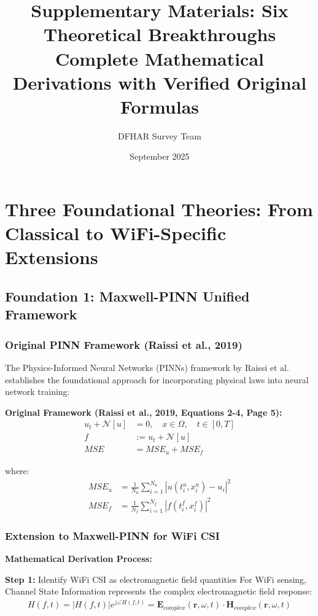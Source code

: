 \documentclass[12pt,a4paper]{article}
\title{Supplementary Materials: Six Theoretical Breakthroughs\\Complete Mathematical Derivations with Verified Original Formulas}
\author{DFHAR Survey Team}
\date{September 2025}
\begin{document}
\maketitle

\section{Three Foundational Theories: From Classical to WiFi-Specific Extensions}

\subsection{Foundation 1: Maxwell-PINN Unified Framework}

\subsubsection{Original PINN Framework (Raissi et al., 2019)}

The Physics-Informed Neural Networks (PINNs) framework by Raissi et al. \cite{raissi2019physics} establishes the foundational approach for incorporating physical laws into neural network training:

\textbf{Original Framework (Raissi et al., 2019, Equations 2-4, Page 5):}
\begin{align}
u_t + \mathcal{N}[u] &= 0, \quad x \in \Omega, \quad t \in [0,T] \label{eq:raissi_pde}\\
f &:= u_t + \mathcal{N}[u] \label{eq:raissi_residual}\\
MSE &= MSE_u + MSE_f \label{eq:raissi_loss}
\end{align}

where:
\begin{align}
MSE_u &= \frac{1}{N_u} \sum_{i=1}^{N_u} |u(t_i^u, x_i^u) - u_i|^2 \label{eq:raissi_data_loss}\\
MSE_f &= \frac{1}{N_f} \sum_{i=1}^{N_f} |f(t_i^f, x_i^f)|^2 \label{eq:raissi_physics_loss}
\end{align}

\subsubsection{Extension to Maxwell-PINN for WiFi CSI}

\textbf{Mathematical Derivation Process:}

\textbf{Step 1:} Identify WiFi CSI as electromagnetic field quantities
For WiFi sensing, Channel State Information represents the complex electromagnetic field response:
\begin{align}
H(f,t) = |H(f,t)| e^{j\angle H(f,t)} = \mathbf{E}_{complex}(\mathbf{r},\omega,t) \cdot \mathbf{H}_{complex}(\mathbf{r},\omega,t)
\end{align}
\end{document}
